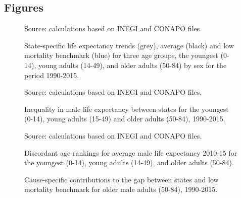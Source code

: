 \documentclass{bmcart}
\begin{document}
\begin{backmatter}



\section*{Figures}

\begin{figure}[h!]
\centering
\caption{State-specific life expectancy trends (grey), average (black) and low mortality benchmark (blue) for three age groups, the youngest (0-14), young adults (14-49), and older adults (50-84) by sex for the period 1990-2015.}
\label{Fig1}

Source: calculations based on INEGI and CONAPO files. 
\end{figure}



\begin{figure}[h!]
\centering
\caption{Inequality in male life expectancy between states for the youngest (0-14), young adults (15-49) and older adults (50-84), 1990-2015.}
\label{Fig2}

Source: calculations based on INEGI and CONAPO files. 
\end{figure}

\begin{figure}[h!]
\centering
\caption{Discordant age-rankings for average male life expectancy 2010-15 for the youngest (0-14), young adults (14-49), and older adults (50-84).}
\label{Fig3}
Source: calculations based on INEGI and CONAPO files. 
\end{figure}



\begin{figure}[h!]
\centering
\caption{Cause-specific contributions to the gap between states and low mortality benchmark for older male adults (50-84), 1990-2015.}
\label{Fig4}


\end{figure}
\end{backmatter}
\end{document}
